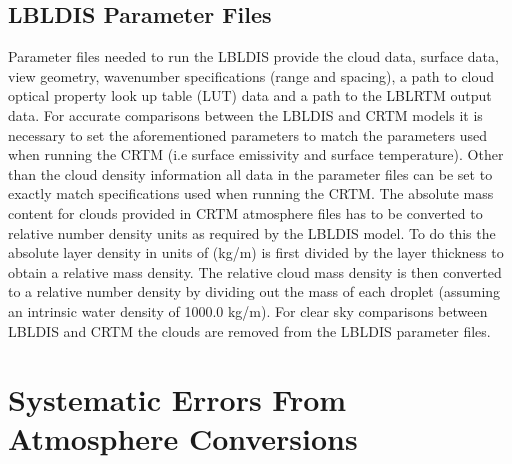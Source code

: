 
\subsection{LBLDIS Parameter Files}
Parameter files needed to run the LBLDIS provide the cloud data, surface data, view geometry, wavenumber specifications (range and spacing), a path to cloud optical property look up table (LUT) data and a path to the LBLRTM output data. For accurate comparisons between the LBLDIS and CRTM models it is necessary to set the aforementioned
parameters to match the parameters used when running the CRTM (i.e surface emissivity and surface temperature).  
Other than the cloud density information all data in the parameter files can be set to exactly match specifications used when running the CRTM. The absolute mass content for clouds provided in CRTM atmosphere files has to be converted to relative number density units as required by the LBLDIS model.
To do this the absolute layer density in units of (kg/m) is first divided by the layer thickness to obtain a relative mass density. The relative cloud mass density is then converted to a relative number density by dividing out the mass of each droplet (assuming an intrinsic water density of 1000.0 kg/m).  
For clear sky comparisons between LBLDIS and CRTM the clouds are removed from the LBLDIS parameter files. 



\section{Systematic Errors From Atmosphere Conversions}

